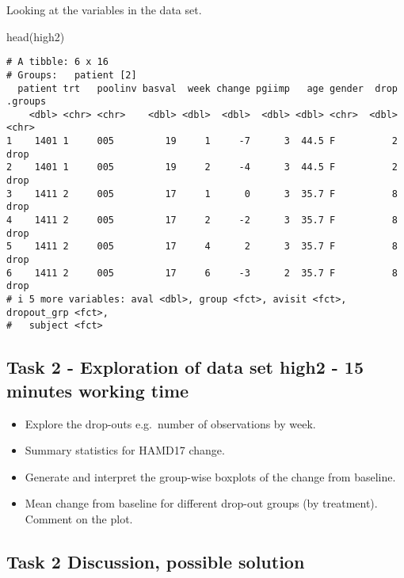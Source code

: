 \documentclass[
  letterpaper,
  DIV=11,
  numbers=noendperiod]{scrreprt}
\newenvironment{Shaded}{\begin{snugshade}}{\end{snugshade}}
\newcommand{\FunctionTok}[1]{\textcolor[rgb]{0.28,0.35,0.67}{#1}}
\newcommand{\NormalTok}[1]{\textcolor[rgb]{0.00,0.23,0.31}{#1}}
\providecommand{\tightlist}{%
  \setlength{\itemsep}{0pt}\setlength{\parskip}{0pt}}\usepackage{longtable,booktabs,array}
\begin{document}
Looking at the variables in the data set.

\begin{Shaded}
\begin{Highlighting}[]
\FunctionTok{head}\NormalTok{(high2)}
\end{Highlighting}
\end{Shaded}

\begin{verbatim}
# A tibble: 6 x 16
# Groups:   patient [2]
  patient trt   poolinv basval  week change pgiimp   age gender  drop .groups
    <dbl> <chr> <chr>    <dbl> <dbl>  <dbl>  <dbl> <dbl> <chr>  <dbl> <chr>  
1    1401 1     005         19     1     -7      3  44.5 F          2 drop   
2    1401 1     005         19     2     -4      3  44.5 F          2 drop   
3    1411 2     005         17     1      0      3  35.7 F          8 drop   
4    1411 2     005         17     2     -2      3  35.7 F          8 drop   
5    1411 2     005         17     4      2      3  35.7 F          8 drop   
6    1411 2     005         17     6     -3      2  35.7 F          8 drop   
# i 5 more variables: aval <dbl>, group <fct>, avisit <fct>, dropout_grp <fct>,
#   subject <fct>
\end{verbatim}

\hypertarget{task-2---exploration-of-data-set-high2---15-minutes-working-time}{%
\subsection{Task 2 - Exploration of data set high2 - 15 minutes working
time}\label{task-2---exploration-of-data-set-high2---15-minutes-working-time}}

\begin{itemize}
\tightlist
\item
  Explore the drop-outs e.g.~number of observations by week.
\item
  Summary statistics for HAMD17 change.
\item
  Generate and interpret the group-wise boxplots of the change from
  baseline.
\item
  Mean change from baseline for different drop-out groups (by
  treatment). Comment on the plot.
\end{itemize}

\hypertarget{task-2-discussion-possible-solution}{%
\subsection{Task 2 Discussion, possible
solution}\label{task-2-discussion-possible-solution}}
\end{document}
